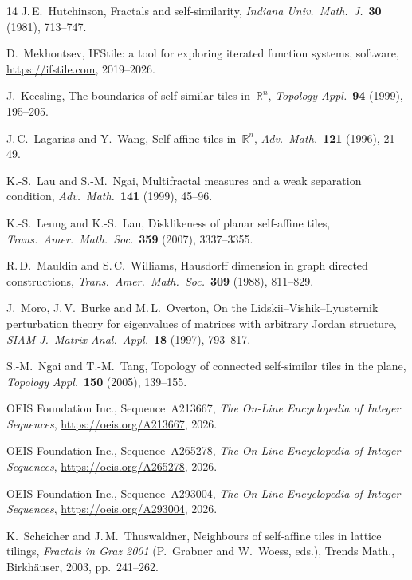 \documentclass{amsart}
\theoremstyle{definition}
\theoremstyle{remark}
\newcommand{\R}{\mathbb{R}}
\begin{document}
\begin{thebibliography}{14}
J.\,E.~Hutchinson,
Fractals and self-similarity,
\emph{Indiana Univ.\ Math.\ J.}\ \textbf{30} (1981), 713--747.

D.~Mekhontsev,
IFStile: a tool for exploring iterated function systems,
software, \url{https://ifstile.com}, 2019--2026.

J.~Keesling,
The boundaries of self-similar tiles in~$\R^n$,
\emph{Topology Appl.}\ \textbf{94} (1999), 195--205.

J.\,C.~Lagarias and Y.~Wang,
Self-affine tiles in~$\R^n$,
\emph{Adv.\ Math.}\ \textbf{121} (1996), 21--49.

K.-S.~Lau and S.-M.~Ngai,
Multifractal measures and a weak separation condition,
\emph{Adv.\ Math.}\ \textbf{141} (1999), 45--96.

K.-S.~Leung and K.-S.~Lau,
Disklikeness of planar self-affine tiles,
\emph{Trans.\ Amer.\ Math.\ Soc.}\ \textbf{359} (2007), 3337--3355.

R.\,D.~Mauldin and S.\,C.~Williams,
Hausdorff dimension in graph directed constructions,
\emph{Trans.\ Amer.\ Math.\ Soc.}\ \textbf{309} (1988), 811--829.

J.~Moro, J.\,V.~Burke and M.\,L.~Overton,
On the Lidskii--Vishik--Lyusternik perturbation theory for
eigenvalues of matrices with arbitrary Jordan structure,
\emph{SIAM J.\ Matrix Anal.\ Appl.}\ \textbf{18} (1997), 793--817.

S.-M.~Ngai and T.-M.~Tang,
Topology of connected self-similar tiles in the plane,
\emph{Topology Appl.}\ \textbf{150} (2005), 139--155.

OEIS Foundation Inc.,
Sequence~A213667,
\emph{The On-Line Encyclopedia of Integer Sequences},
\url{https://oeis.org/A213667}, 2026.

OEIS Foundation Inc.,
Sequence~A265278,
\emph{The On-Line Encyclopedia of Integer Sequences},
\url{https://oeis.org/A265278}, 2026.

OEIS Foundation Inc.,
Sequence~A293004,
\emph{The On-Line Encyclopedia of Integer Sequences},
\url{https://oeis.org/A293004}, 2026.

K.~Scheicher and J.\,M.~Thuswaldner,
Neighbours of self-affine tiles in lattice tilings,
\emph{Fractals in Graz 2001} (P.~Grabner and W.~Woess, eds.),
Trends Math., Birkh{\"a}user, 2003, pp.~241--262.

\end{thebibliography}
\end{document}
